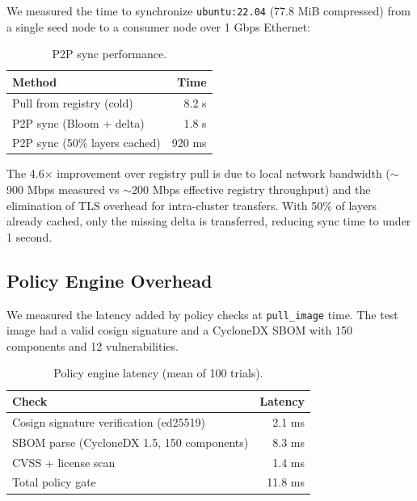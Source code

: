 \documentclass[11pt,a4paper]{article}
\begin{document}
We measured the time to synchronize \texttt{ubuntu:22.04} (77.8 MiB compressed) from a single seed node to a consumer node over 1 Gbps Ethernet:

\begin{table}[htbp]
    \centering
    \caption{P2P sync performance.}
    \label{tab:p2p}
    \begin{tabular}{@{}lr@{}}
        \toprule
        \textbf{Method} & \textbf{Time} \\
        \midrule
        Pull from registry (cold) & 8.2 s \\
        P2P sync (Bloom + delta) & 1.8 s \\
        P2P sync (50\% layers cached) & 920 ms \\
        \bottomrule
    \end{tabular}
\end{table}

The 4.6$\times$ improvement over registry pull is due to local network bandwidth ($\sim$900 Mbps measured vs $\sim$200 Mbps effective registry throughput) and the elimination of TLS overhead for intra-cluster transfers. With 50\% of layers already cached, only the missing delta is transferred, reducing sync time to under 1 second.

\subsection{Policy Engine Overhead}

We measured the latency added by policy checks at \texttt{pull\_image} time. The test image had a valid cosign signature and a CycloneDX SBOM with 150 components and 12 vulnerabilities.

\begin{table}[htbp]
    \centering
    \caption{Policy engine latency (mean of 100 trials).}
    \label{tab:policy-latency}
    \begin{tabular}{@{}lr@{}}
        \toprule
        \textbf{Check} & \textbf{Latency} \\
        \midrule
        Cosign signature verification (ed25519) & 2.1 ms \\
        SBOM parse (CycloneDX 1.5, 150 components) & 8.3 ms \\
        CVSS + license scan & 1.4 ms \\
        \midrule
        Total policy gate & 11.8 ms \\
        \bottomrule
    \end{tabular}
\end{table}
\end{document}
